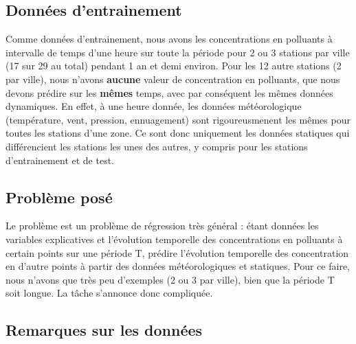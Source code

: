\subsection{Données d'entrainement}

Comme données d'entrainement, nous avons les concentrations en polluants à intervalle de temps d'une heure sur toute la période pour 2 ou 3 stations par ville (17 sur 29 au total) pendant 1 an et demi environ.
Pour les 12 autre stations (2 par ville), nous n'avons \textbf{aucune} valeur de concentration en polluants, que nous devons prédire sur les \textbf{mêmes} temps, avec par conséquent les mêmes données dynamiques. En effet, à une heure donnée, les données météorologique (température, vent, pression, ennuagement) sont rigoureusmenent les mêmes pour toutes les stations d'une zone. Ce sont donc uniquement les données statiques qui différencient les stations les unes des autres, y compris pour les stations d'entrainement et de test. %

\subsection{Problème posé}

Le problème est un problème de régression très général : étant données les variables explicatives et l'évolution temporelle des concentrations en polluants à certain points sur une période T, prédire l'évolution temporelle des concentration en d'autre points à partir des données météorologiques et statiques.
Pour ce faire, nous n'avons que très peu d'exemples (2 ou 3 par ville), bien que la période T soit longue.
La tâche s'annonce donc compliquée.

\subsection{Remarques sur les données}

